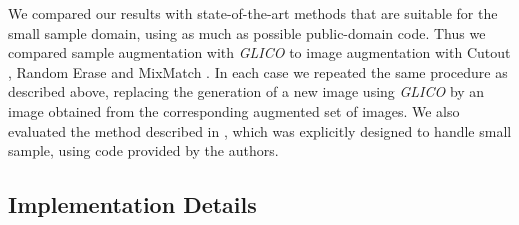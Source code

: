 \documentclass[a4paper,conference]{IEEEtran}
\begin{document}
We compared our results with state-of-the-art methods that are suitable for the small sample domain, using as much as possible public-domain code. Thus we compared sample augmentation with \textit{GLICO} to image augmentation with Cutout \cite{devries2017improved}, Random Erase \cite{randomerasing} and MixMatch \cite{berthelot2019mixmatch}. In each case we repeated the same procedure as described above, replacing the generation of a new image using \textit{GLICO} by an image obtained from the corresponding augmented set of images. We also evaluated the method described in \cite{cosinesmalldata}, which was explicitly designed to handle small sample, using code provided by the authors. 

\subsection{Implementation Details}
\end{document}
